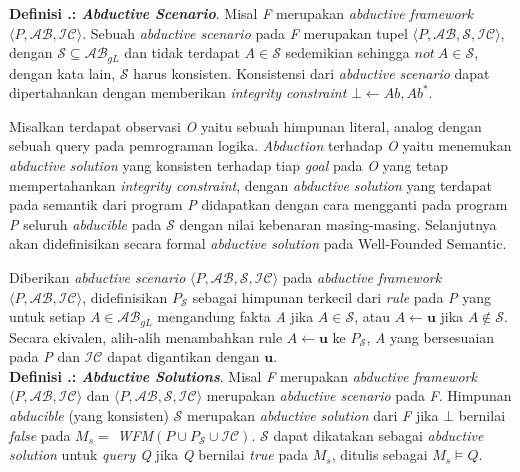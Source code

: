 \noindent \textbf{Definisi \thebabDuaNum.\thedefBabDua: \textit{Abductive Scenario}}. Misal \textit{F} merupakan \textit{abductive framework} $\langle P, \mathcal{AB}, \mathcal{IC} \rangle$.  Sebuah \textit{abductive scenario} pada \textit{F} merupakan tupel $\langle P, \mathcal{AB}, \mathcal{S}, \mathcal{IC} \rangle$, dengan $\mathcal{S} \subseteq \mathcal{AB}_{gL}$ dan tidak terdapat $A \in \mathcal{S}$ sedemikian sehingga $not \ A \in \mathcal{S}$, dengan kata lain, $\mathcal{S}$ harus konsisten. Konsistensi dari \textit{abductive scenario} dapat dipertahankan dengan memberikan \textit{integrity constraint} $\bot \leftarrow Ab,Ab^*$.

Misalkan terdapat observasi \textit{O} yaitu sebuah himpunan literal, analog dengan sebuah query pada pemrograman logika. \textit{Abduction} terhadap \textit{O} yaitu menemukan \textit{abductive solution} yang konsisten terhadap tiap \textit{goal} pada \textit{O} yang tetap mempertahankan \textit{integrity constraint}, dengan \textit{abductive solution} yang terdapat pada semantik dari program \textit{P} didapatkan dengan cara mengganti pada program \textit{P} seluruh \textit{abducible} pada $\mathcal{S}$ dengan nilai kebenaran masing-masing. Selanjutnya akan didefinisikan secara formal \textit{abductive solution} pada Well-Founded Semantic.

Diberikan \textit{abductive scenario} $\langle P, \mathcal{AB}, \mathcal{S}, \mathcal{IC} \rangle$ pada \textit{abductive framework} $\langle P, \mathcal{AB}, \mathcal{IC} \rangle$, didefinisikan $P_{\mathcal{S}}$ sebagai himpunan terkecil dari \textit{rule} pada \textit{P} yang   untuk setiap $A \in \mathcal{AB}_{gL}$ mengandung fakta \textit{A} jika $A \in \mathcal{S}$, atau $A \leftarrow \bm{u}$ jika $A \notin \mathcal{S}$. Secara ekivalen, alih-alih menambahkan rule $A \leftarrow \bm{u}$ ke $P_{\mathcal{S}}$, \textit{A} yang bersesuaian pada \textit{P} dan $\mathcal{IC}$ dapat digantikan dengan $\bm{u}$.
\\

\noindent \textbf{Definisi \thebabDuaNum.\thedefBabDua: \textit{Abductive Solutions}}. Misal \textit{F} merupakan \textit{abductive framework} $\langle P, \mathcal{AB}, \mathcal{IC} \rangle$ dan $\langle P, \mathcal{AB}, \mathcal{S}, \mathcal{IC} \rangle$ merupakan \textit{abductive scenario} pada \textit{F}. Himpunan \textit{abducible} (yang konsisten) $\mathcal{S}$ merupakan \textit{abductive solution} dari \textit{F} jika $\bot$ bernilai \textit{false} pada $M_s = $ \textit{WFM}$(P \cup P_\mathcal{S} \cup \mathcal{IC})$. $\mathcal{S}$ dapat dikatakan sebagai \textit{abductive solution} untuk \textit{query Q} jika \textit{Q} bernilai \textit{true} pada $M_s$, ditulis sebagai $M_s \models Q$.
\\

